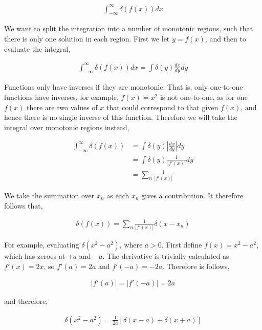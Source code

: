 \documentclass[11pt]{amsart}
\begin{document}
\begin{align*}
  \int_{-\infty}^{\infty} \delta\left(f(x)\right) dx
\end{align*}

We want to split the integration into a number of monotonic regions, such that there is only one solution in each region. First we let $y = f(x)$, and then to evaluate the integral,

\begin{align*}
  \int_{-\infty}^{\infty} \delta\left(f(x)\right) dx = \int \delta(y) \frac{dx}{dy} dy
\end{align*}

Functions only have inverses if they are monotonic. That is, only one-to-one functions have inverses, for example, $f(x) = x^2$ is not one-to-one, as for one $f(x)$ there are two values of $x$ that could correspond to that given $f(x)$, and hence there is no single inverse of this function. Therefore we will take the integral over monotonic regions instead,

\begin{align*}
  \int_{-\infty}^{\infty} \delta\left(f(x)\right) &= \int \delta(y) \left|\frac{dx}{dy}\right| dy \\
                                                  &= \int \delta(y) \frac{1}{|f'(x)|} dy \\
                                                  &= \sum\limits_n \frac{1}{|f'(x)|}
\end{align*}

We take the summation over $x_n$ as each $x_n$ gives a contribution. It therefore follows that,

\begin{align*}
  \delta\left(f(x)\right) = \sum\limits_n \frac{1}{|f'(x)|} \delta(x - x_n)
\end{align*}

For example, evaluating $\delta(x^2 - a^2)$, where $a > 0$. First define $f(x) = x^2 - a^2$, which has zeroes at $+a$ and $-a$. The derivative is trivially calculated as $f'(x) = 2x$, so $f'(a) = 2a$ and $f'(-a) = -2a$. Therefore is follows,

\begin{align*}
  |f'(a)| = |f'(-a)| = 2a
\end{align*}

and therefore,

\begin{align*}
  \delta(x^2 - a^2) = \frac{1}{2a}\left[\delta(x - a) + \delta(x + a)\right]
\end{align*}
\end{document}
